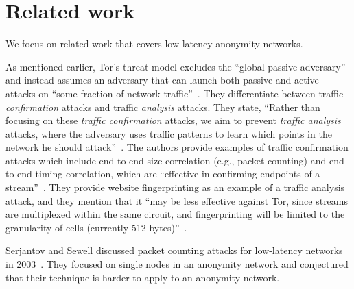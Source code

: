 \section{Related work}
\label{sec:related_work}

We focus on related work that covers low-latency anonymity networks.

As mentioned earlier, Tor's threat model excludes the ``global passive adversary''
and instead assumes an adversary that can launch both passive and active attacks
on ``some fraction of network traffic''~\cite{Dingledine2004a}. They differentiate between traffic
\textit{confirmation} attacks and traffic \textit{analysis} attacks. They state, ``Rather than focusing on these
\textit{traffic confirmation} attacks, we aim to prevent \textit{traffic analysis} attacks,
where the adversary uses traffic patterns to learn which points in the network
he should attack''~\cite{Dingledine2004a}.
The authors provide examples of traffic confirmation attacks which
include end-to-end size correlation (e.g., packet counting) and end-to-end timing correlation,
which are ``effective in confirming endpoints of a stream''~\cite{Dingledine2004a}. They provide website
fingerprinting as an example of a traffic analysis attack, and they mention that it
``may be less effective against Tor, since streams are multiplexed within the same circuit,
and fingerprinting will be limited to the granularity of cells (currently 512 bytes)''~\cite{Dingledine2004a}.

Serjantov and Sewell discussed packet counting attacks for low-latency networks
in 2003~\cite{Serjantov2003a}.  They focused on single nodes in an anonymity
network and conjectured that their technique is harder to apply to an anonymity
network.

